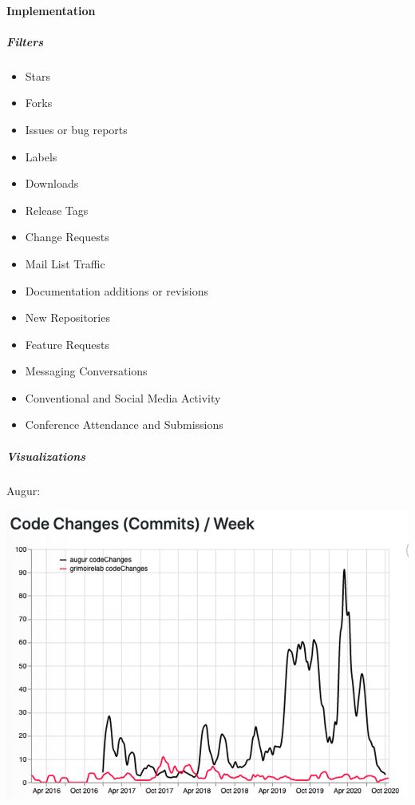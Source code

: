 \hypertarget{implementation}{%
\paragraph{Implementation}\label{implementation}}

\hypertarget{filters}{%
\subparagraph{Filters}\label{filters}}

\begin{itemize}
\tightlist
\item
  Stars
\item
  Forks
\item
  Issues or bug reports
\item
  Labels
\item
  Downloads
\item
  Release Tags
\item
  Change Requests
\item
  Mail List Traffic
\item
  Documentation additions or revisions
\item
  New Repositories
\item
  Feature Requests
\item
  Messaging Conversations
\item
  Conventional and Social Media Activity
\item
  Conference Attendance and Submissions
\end{itemize}

\hypertarget{visualizations}{%
\subparagraph{Visualizations}\label{visualizations}}

Augur:

\includegraphics{images/burstiness_augur.png}

